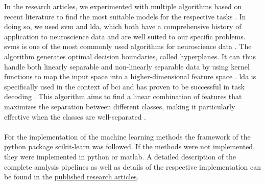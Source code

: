 \noindent In the research articles, we experimented with multiple algorithms based on recent literature to find the most suitable models for the respective tasks \cite{shoorangiz2021eeg}. In doing so, we used \gls{svm} and \gls{lda}, which both have a comprehensive history of application to neuroscience data and are well suited to our specific problems.  \Glspl{svm} is one of the most commonly used algorithms for neuroscience data \cite{VAROQUAUX2017166}. The algorithm generates optimal decision boundaries, called hyperplanes. It can thus handle both linearly separable and non-linearly separable data by using kernel functions to map the input space into a higher-dimensional feature space \cite{shoorangiz2021eeg}. \Gls{lda} is specifically used in the context of \Gls{bci} and has proven to be successful in task decoding \cite{Blankertz2008}. This algorithm aims to find a linear combination of features that maximizes the separation between different classes, making it particularly effective when the classes are well-separated \cite{shoorangiz2021eeg}.\\
\\
For the implementation of the machine learning methods the framework of the python package scikit-learn was followed. If the methods were not implemented, they were implemented in python or matlab. A detailed description of the complete analysis pipelines as well as details of the respective implementation can be found in the \hyperref[{pub:reserach_articles}]{published research articles}. 


